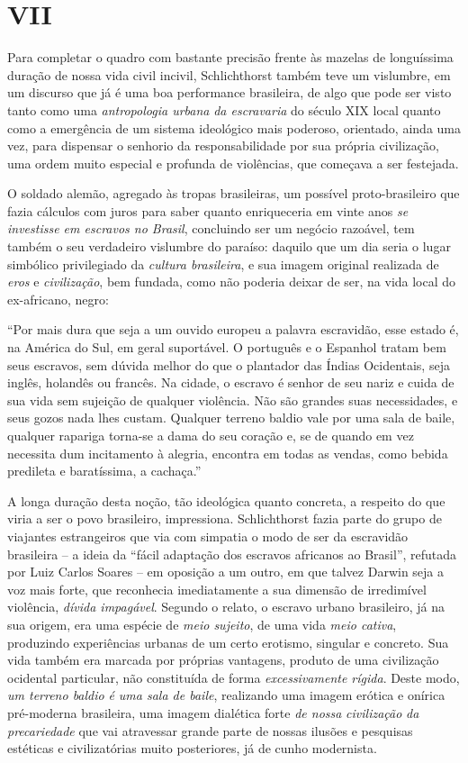 \section{VII}

Para completar o quadro com bastante precisão frente às mazelas de
longuíssima duração de nossa vida civil incivil, Schlichthorst também
teve um vislumbre, em um discurso que já é uma boa performance
brasileira, de algo que pode ser visto tanto como uma \emph{antropologia
urbana} \emph{da escravaria} do século XIX local quanto como a
emergência de um sistema ideológico mais poderoso, orientado, ainda uma
vez, para dispensar o senhorio da responsabilidade por sua própria
civilização, uma ordem muito especial e profunda de violências, que
começava a ser festejada.

O soldado alemão, agregado às tropas brasileiras, um possível
proto-brasileiro que fazia cálculos com juros para saber quanto
enriqueceria em vinte anos \emph{se investisse em escravos no Brasil},
concluindo ser um negócio razoável, tem também o seu verdadeiro
vislumbre do paraíso: daquilo que um dia seria o lugar simbólico
privilegiado da \emph{cultura brasileira}, e sua imagem original
realizada de \emph{eros} e \emph{civilização}, bem fundada, como não
poderia deixar de ser, na vida local do ex-africano, negro:

``Por mais dura que seja a um ouvido europeu a palavra escravidão, esse
estado é, na América do Sul, em geral suportável. O português e o
Espanhol tratam bem seus escravos, sem dúvida melhor do que o plantador
das Índias Ocidentais, seja inglês, holandês ou francês. Na cidade, o
escravo é senhor de seu nariz e cuida de sua vida sem sujeição de
qualquer violência. Não são grandes suas necessidades, e seus gozos nada
lhes custam. Qualquer terreno baldio vale por uma sala de baile,
qualquer rapariga torna-se a dama do seu coração e, se de quando em vez
necessita dum incitamento à alegria, encontra em todas as vendas, como
bebida predileta e baratíssima, a cachaça.''

A longa duração desta noção, tão ideológica quanto concreta, a respeito
do que viria a ser o povo brasileiro, impressiona. Schlichthorst fazia
parte do grupo de viajantes estrangeiros que via com simpatia o modo de
ser da escravidão brasileira -- a ideia da ``fácil adaptação dos
escravos africanos ao Brasil'', refutada por Luiz Carlos Soares -- em
oposição a um outro, em que talvez Darwin seja a voz mais forte, que
reconhecia imediatamente a sua dimensão de irredimível violência,
\emph{dívida impagável}. Segundo o relato, o escravo urbano brasileiro,
já na sua origem, era uma espécie de \emph{meio sujeito}, de uma vida
\emph{meio cativa}, produzindo experiências urbanas de um certo
erotismo, singular e concreto. Sua vida também era marcada por próprias
vantagens, produto de uma civilização ocidental particular, não
constituída de forma \emph{excessivamente rígida}. Deste modo, \emph{um
terreno baldio} \emph{é uma sala de baile}, realizando uma imagem
erótica e onírica pré-moderna brasileira, uma imagem dialética forte
\emph{de nossa} \emph{civilização} \emph{da} \emph{precariedade} que vai
atravessar grande parte de nossas ilusões e pesquisas estéticas e
civilizatórias muito posteriores, já de cunho modernista.


